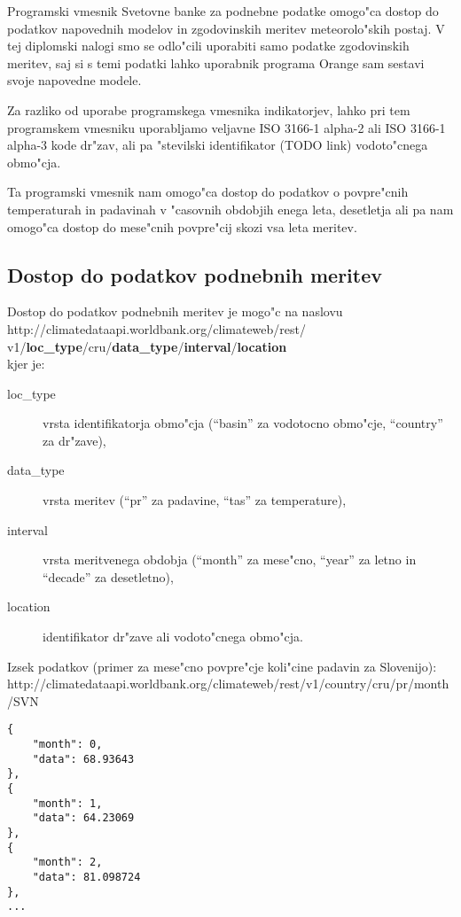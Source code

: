 Programski vmesnik Svetovne banke za podnebne podatke omogo"ca dostop do 
podatkov napovednih modelov in zgodovinskih meritev meteorolo"skih postaj. V tej 
diplomski nalogi smo se odlo"cili uporabiti samo podatke zgodovinskih meritev, 
saj si s temi podatki lahko uporabnik programa Orange sam sestavi svoje 
napovedne modele.

Za razliko od uporabe programskega vmesnika indikatorjev, lahko pri tem
programskem vmesniku uporabljamo veljavne ISO 3166-1 alpha-2 ali ISO 3166-1 
alpha-3 kode dr"zav, ali pa "stevilski identifikator (TODO link) vodoto"cnega 
obmo"cja.

Ta programski vmesnik nam omogo"ca dostop do podatkov o povpre"cnih temperaturah 
in padavinah v "casovnih obdobjih enega leta, desetletja ali pa nam omogo"ca 
dostop do mese"cnih povpre"cij skozi vsa leta meritev.


\subsection{Dostop do podatkov podnebnih meritev}

Dostop do podatkov podnebnih meritev je mogo"c na naslovu \\
http://climatedataapi.worldbank.org/climateweb/rest/\\
v1/\textbf{loc\_type}/cru/\textbf{data\_type}/\textbf{interval}/\textbf{location}\\
kjer je:
\begin{description}
\item [loc\_type] vrsta identifikatorja obmo"cja (``basin'' za vodotocno obmo"cje, 
  ``country'' za dr"zave),
\item [data\_type] vrsta meritev (``pr'' za padavine, ``tas'' za temperature),
\item [interval] vrsta meritvenega obdobja (``month'' za mese"cno, ``year'' za letno in
  ``decade'' za desetletno),
\item [location] identifikator dr"zave ali vodoto"cnega obmo"cja.
\end{description}


Izsek podatkov (primer za mese"cno povpre"cje koli"cine padavin za Slovenijo):
http://climatedataapi.worldbank.org/climateweb/rest/v1/country/cru/pr/month/SVN

\begin{lstlisting}
{
    "month": 0,
    "data": 68.93643
},
{
    "month": 1,
    "data": 64.23069
},
{
    "month": 2,
    "data": 81.098724
},
...
\end{lstlisting}











